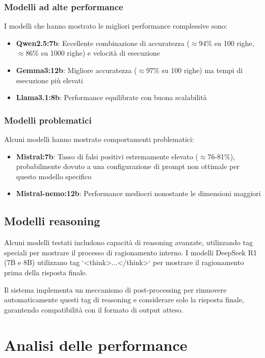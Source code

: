 \documentclass[12pt]{report}
\begin{document}
\subsubsection{Modelli ad alte performance}
I modelli che hanno mostrato le migliori performance complessive sono:

\begin{itemize}
    \item \textbf{Qwen2.5:7b}: Eccellente combinazione di accuratezza ($\approx$94\% su 100 righe, $\approx$86\% su 1000 righe) e velocità di esecuzione
    \item \textbf{Gemma3:12b}: Migliore accuratezza ($\approx$97\% su 100 righe) ma tempi di esecuzione più elevati
    \item \textbf{Llama3.1:8b}: Performance equilibrate con buona scalabilità
\end{itemize}

\subsubsection{Modelli problematici}
Alcuni modelli hanno mostrato comportamenti problematici:

\begin{itemize}
    \item \textbf{Mistral:7b}: Tasso di falsi positivi estremamente elevato ($\approx$76-81\%), probabilmente dovuto a una configurazione di prompt non ottimale per questo modello specifico
    \item \textbf{Mistral-nemo:12b}: Performance mediocri nonostante le dimensioni maggiori
\end{itemize}

\subsection{Modelli reasoning}
\label{subsec:modelli_reasoning}

Alcuni modelli testati includono capacità di reasoning avanzate, utilizzando tag speciali per mostrare il processo di ragionamento interno. I modelli DeepSeek R1 (7B e 8B) utilizzano tag `<think>...</think>` per mostrare il ragionamento prima della risposta finale.

Il sistema implementa un meccanismo di post-processing per rimuovere automaticamente questi tag di reasoning e considerare solo la risposta finale, garantendo compatibilità con il formato di output atteso.

\section{Analisi delle performance}
\label{sec:analisi_performance}
\end{document}
